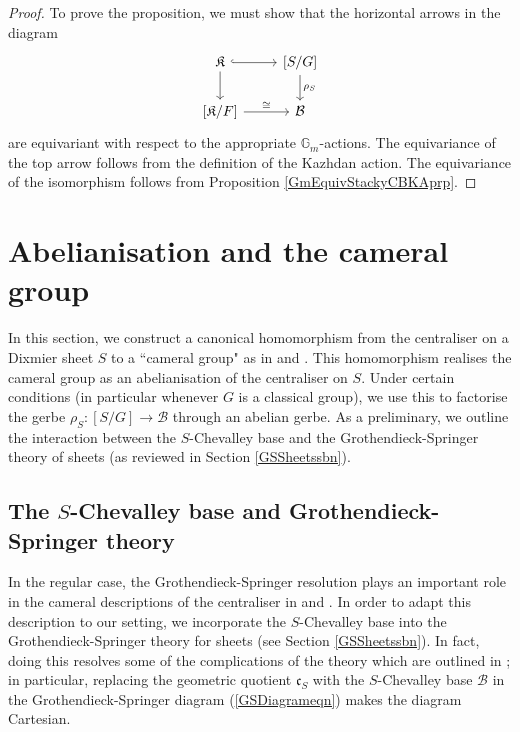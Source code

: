 \documentclass{amsart}
\theoremstyle{remark}
\numberwithin{theorem}{section}
\numberwithin{equation}{section}
\begin{document}
\begin{proof} 
To prove the proposition, we must show that the horizontal arrows in the diagram
\begin{equation}\label{StackyHKSection2eqn}
    \begin{tikzcd}
        \mathfrak{K} \arrow[r, hook] \arrow[d] & {[S/G]} \arrow[d, "\rho_S"] \\
        {[\mathfrak{K}/F]} \arrow[r, "\cong"]  & \mathcal B         
    \end{tikzcd}
\end{equation}
are equivariant with respect to the appropriate $\mathbb{G}_m$-actions. The equivariance of the top arrow follows from the definition of the Kazhdan action. The equivariance of the isomorphism follows from Proposition \ref{GmEquivStackyCBKAprp}.
\end{proof}

\section{Abelianisation and the cameral group}\label{Abelianisationscn}
In this section, we construct a canonical homomorphism from the centraliser on a Dixmier sheet $S$ to a ``cameral group" as in \cite{DG} and \cite{Ngo2}. This homomorphism realises the cameral group as an abelianisation of the centraliser on $S$. Under certain conditions (in particular whenever $G$ is a classical group), we use this to factorise the gerbe $\rho_S:[S/G] \rightarrow \mathcal B$ through an abelian gerbe. As a preliminary, we outline the interaction between the $S$-Chevalley base and the Grothendieck-Springer theory of sheets (as reviewed in Section \ref{GSSheetssbn}).

\subsection{The \texorpdfstring{$S$}{S}-Chevalley base and Grothendieck-Springer theory}\label{SCBGSsbn}
In the regular case, the Grothendieck-Springer resolution plays an important role in the cameral descriptions of the centraliser in \cite{DG} and \cite{Ngo2}. In order to adapt this description to our setting, we incorporate the $S$-Chevalley base into the Grothendieck-Springer theory for sheets (see Section \ref{GSSheetssbn}). In fact, doing this resolves some of the complications of the theory which are outlined in \cite{Broer1}; in particular, replacing the geometric quotient $\mathfrak{c}_S$ with the $S$-Chevalley base $\mathcal B$ in the Grothendieck-Springer diagram (\ref{GSDiagrameqn}) makes the diagram Cartesian.
\end{document}
